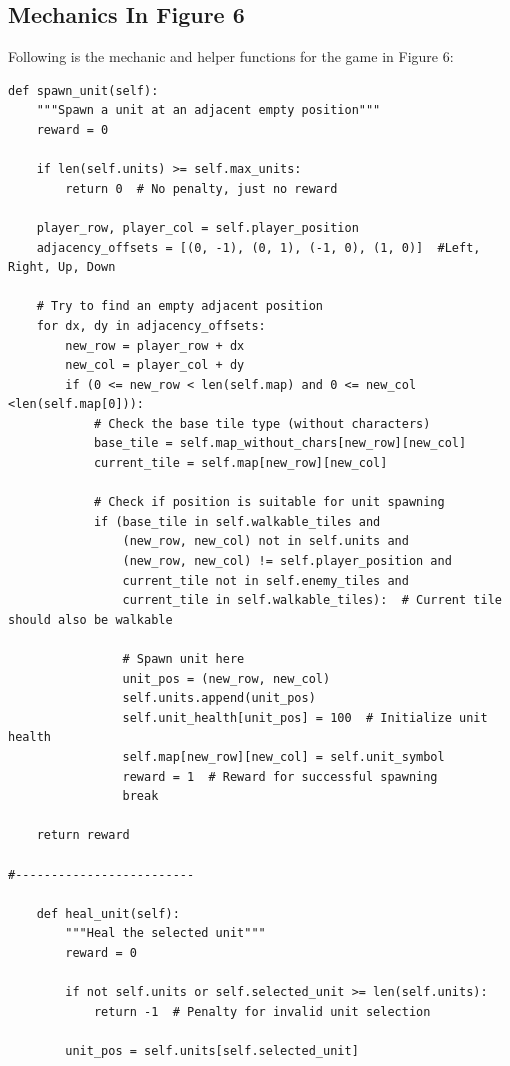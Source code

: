 \documentclass{article} %
\begin{document}
\subsection{Mechanics In Figure 6}

Following is the mechanic and helper functions for the game in Figure 6:

\begin{lstlisting}
def spawn_unit(self):
    """Spawn a unit at an adjacent empty position"""
    reward = 0
    
    if len(self.units) >= self.max_units:
        return 0  # No penalty, just no reward
        
    player_row, player_col = self.player_position
    adjacency_offsets = [(0, -1), (0, 1), (-1, 0), (1, 0)]  #Left, Right, Up, Down
    
    # Try to find an empty adjacent position
    for dx, dy in adjacency_offsets:
        new_row = player_row + dx
        new_col = player_col + dy
        if (0 <= new_row < len(self.map) and 0 <= new_col <len(self.map[0])):
            # Check the base tile type (without characters)
            base_tile = self.map_without_chars[new_row][new_col]
            current_tile = self.map[new_row][new_col]
            
            # Check if position is suitable for unit spawning
            if (base_tile in self.walkable_tiles and 
                (new_row, new_col) not in self.units and
                (new_row, new_col) != self.player_position and
                current_tile not in self.enemy_tiles and
                current_tile in self.walkable_tiles):  # Current tile should also be walkable
                
                # Spawn unit here
                unit_pos = (new_row, new_col)
                self.units.append(unit_pos)
                self.unit_health[unit_pos] = 100  # Initialize unit health
                self.map[new_row][new_col] = self.unit_symbol
                reward = 1  # Reward for successful spawning
                break
    
    return reward

#-------------------------

    def heal_unit(self):
        """Heal the selected unit"""
        reward = 0
        
        if not self.units or self.selected_unit >= len(self.units):
            return -1  # Penalty for invalid unit selection
            
        unit_pos = self.units[self.selected_unit]
        

\end{lstlisting}
\end{document}
